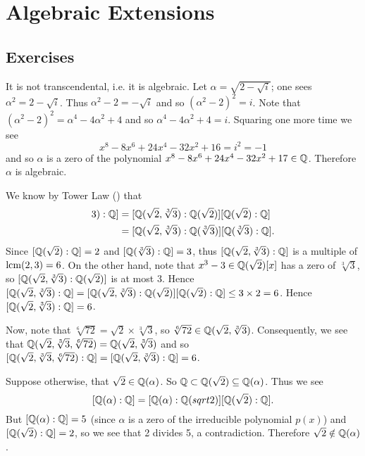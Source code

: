 \section{Algebraic Extensions}
\subsection*{Exercises}
\begin{questions}
    \item It is not transcendental, i.e. it is algebraic. Let $\alpha = \sqrt{2-\sqrt{i}}$; one sees $\alpha^2 = 2 - \sqrt{i}$. Thus $\alpha^2 - 2 = -\sqrt{i}$ and so $(\alpha^2-2)^2 = i$. Note that $(\alpha^2 - 2)^2 = \alpha^4 - 4\alpha^2 + 4$ and so $\alpha^4 - 4\alpha^2 + 4 = i$. Squaring one more time we see
    \[
        x^8 - 8x^6 + 24x^4 - 32x^2 + 16 = i^2 = -1
    \]
    and so $\alpha$ is a zero of the polynomial $x^8 - 8x^6 + 24x^4 - 32x^2 + 17 \in \mathbb{Q}$. Therefore $\alpha$ is algebraic.

    \item We know by Tower Law () that
    \begin{align*}
        [\Q(\sqrt2, \sqrt[3]3): \Q] &= [\Q(\sqrt2, \sqrt[3]3): \Q(\sqrt2)][\Q(\sqrt2):\Q]\\
        &= [\Q(\sqrt2, \sqrt[3]3): \Q(\sqrt[3]3)][\Q(\sqrt[3]3):\Q].
    \end{align*}
    Since $[\mathbb{Q}(\sqrt2):\mathbb{Q}] = 2$ and $[\mathbb{Q}(\sqrt[3]3):\mathbb{Q}] = 3$, thus $[\mathbb{Q}(\sqrt2, \sqrt[3]3): \mathbb{Q}]$ is a multiple of $\mathrm{lcm}(2, 3) = 6$. On the other hand, note that $x^3 - 3 \in \mathbb{Q}(\sqrt2)[x]$ has a zero of $\sqrt[3]3$, so $[\mathbb{Q}(\sqrt2, \sqrt[3]3): \mathbb{Q}(\sqrt2)]$ is at most 3. Hence $[\mathbb{Q}(\sqrt2, \sqrt[3]3): \mathbb{Q}] = [\mathbb{Q}(\sqrt2, \sqrt[3]3): \mathbb{Q}(\sqrt2)][\mathbb{Q}(\sqrt2):\mathbb{Q}] \leq 3 \times 2 = 6$. Hence $[\mathbb{Q}(\sqrt2, \sqrt[3]3): \mathbb{Q}] = 6$.

    Now, note that $\sqrt[6]{72} = \sqrt2 \times \sqrt[3]3$, so $\sqrt[6]{72} \in \mathbb{Q}(\sqrt2, \sqrt[3]3)$. Consequently, we see that $\mathbb{Q}(\sqrt2, \sqrt[3]3, \sqrt[6]{72}) = \mathbb{Q}(\sqrt2, \sqrt[3]3)$ and so $[\mathbb{Q}(\sqrt2, \sqrt[3]3, \sqrt[6]{72}):\mathbb{Q}] = [\mathbb{Q}(\sqrt2, \sqrt[3]3): \mathbb{Q}] = 6$.

    \item Suppose otherwise, that $\sqrt2 \in \mathbb{Q}(\alpha)$. So $\mathbb{Q} \subset \mathbb{Q}(\sqrt2) \subseteq \mathbb{Q}(\alpha)$. Thus we see
    \[
        [\mathbb{Q}(\alpha): \mathbb{Q}] = [\mathbb{Q}(\alpha):\mathbb{Q}(sqrt2)][\mathbb{Q}(\sqrt2):\mathbb{Q}].
    \]
    But $[\mathbb{Q}(\alpha): \mathbb{Q}] = 5$ (since $\alpha$ is a zero of the irreducible polynomial $p(x)$) and $[\mathbb{Q}(\sqrt2):\mathbb{Q}] = 2$, so we see that 2 divides 5, a contradiction. Therefore $\sqrt2 \notin \mathbb{Q}(\alpha)$.


\end{questions}
